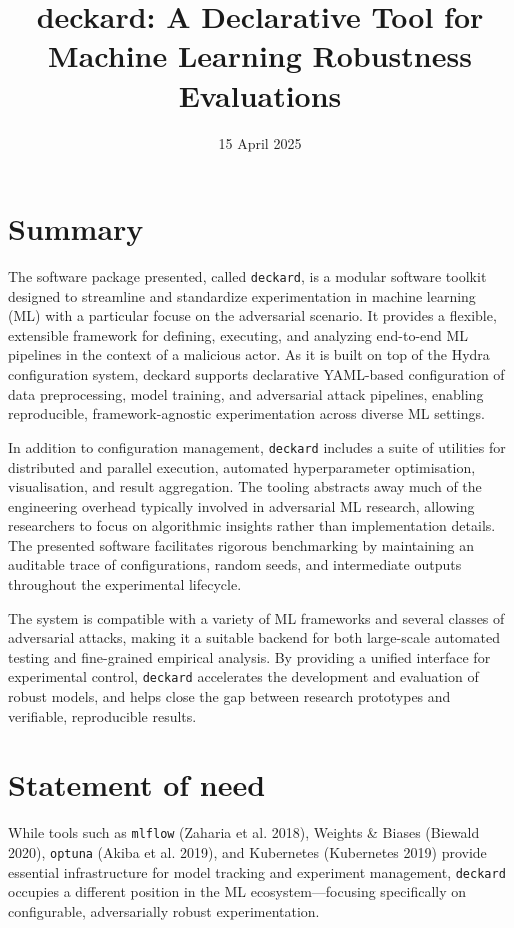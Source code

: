 \documentclass[
]{article}
\title{deckard: A Declarative Tool for Machine Learning Robustness
Evaluations}
\author{}
\date{\vspace{-2.5em}15 April 2025}
\begin{document}
\maketitle
{}

\hypertarget{summary}{%
\section{Summary}\label{summary}}

The software package presented, called \texttt{deckard}, is a modular
software toolkit designed to streamline and standardize experimentation
in machine learning (ML) with a particular focuse on the adversarial
scenario. It provides a flexible, extensible framework for defining,
executing, and analyzing end-to-end ML pipelines in the context of a
malicious actor. As it is built on top of the Hydra configuration
system, deckard supports declarative YAML-based configuration of data
preprocessing, model training, and adversarial attack pipelines,
enabling reproducible, framework-agnostic experimentation across diverse
ML settings.

In addition to configuration management, \texttt{deckard} includes a
suite of utilities for distributed and parallel execution, automated
hyperparameter optimisation, visualisation, and result aggregation. The
tooling abstracts away much of the engineering overhead typically
involved in adversarial ML research, allowing researchers to focus on
algorithmic insights rather than implementation details. The presented
software facilitates rigorous benchmarking by maintaining an auditable
trace of configurations, random seeds, and intermediate outputs
throughout the experimental lifecycle.

The system is compatible with a variety of ML frameworks and several
classes of adversarial attacks, making it a suitable backend for both
large-scale automated testing and fine-grained empirical analysis. By
providing a unified interface for experimental control, \texttt{deckard}
accelerates the development and evaluation of robust models, and helps
close the gap between research prototypes and verifiable, reproducible
results.

\hypertarget{statement-of-need}{%
\section{Statement of need}\label{statement-of-need}}

While tools such as \texttt{mlflow} (Zaharia et al. 2018), Weights \&
Biases (Biewald 2020), \texttt{optuna} (Akiba et al. 2019), and
Kubernetes (Kubernetes 2019) provide essential infrastructure for model
tracking and experiment management, \texttt{deckard} occupies a
different position in the ML ecosystem---focusing specifically on
configurable, adversarially robust experimentation.
\end{document}
